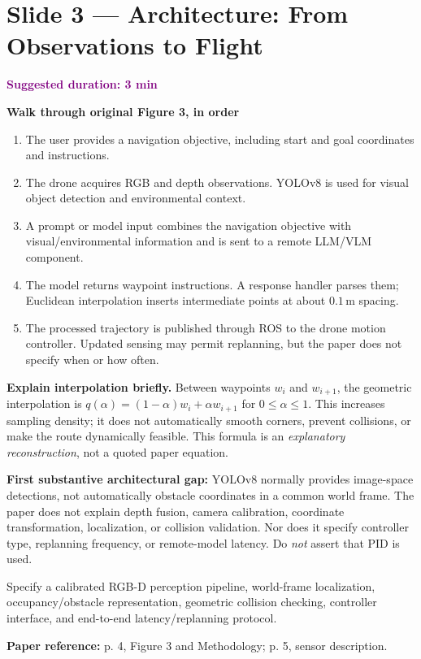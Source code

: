 \documentclass[11pt,a4paper]{article}
\newcommand{\slide}[3]{\clearpage\section*{Slide #1 --- #2}\textcolor{purple}{\textbf{Suggested duration: #3}}\par\medskip}
\newcommand{\source}[1]{\par\small\textcolor{deep}{\textbf{Paper reference:} #1}\normalsize}
\begin{document}
\slide{3}{Architecture: From Observations to Flight}{3 min}
\textbf{Walk through original Figure 3, in order}
\begin{enumerate}[leftmargin=*,itemsep=4pt]
\item The user provides a navigation objective, including start and goal coordinates and instructions.
\item The drone acquires RGB and depth observations. YOLOv8 is used for visual object detection and environmental context.
\item A prompt or model input combines the navigation objective with visual/environmental information and is sent to a remote LLM/VLM component.
\item The model returns waypoint instructions. A response handler parses them; Euclidean interpolation inserts intermediate points at about $0.1\,$m spacing.
\item The processed trajectory is published through ROS to the drone motion controller. Updated sensing may permit replanning, but the paper does not specify when or how often.
\end{enumerate}
\textbf{Explain interpolation briefly.} Between waypoints $w_i$ and $w_{i+1}$, the geometric interpolation is $q(\alpha)=(1-\alpha)w_i+\alpha w_{i+1}$ for $0\leq\alpha\leq1$. This increases sampling density; it does not automatically smooth corners, prevent collisions, or make the route dynamically feasible. This formula is an \emph{explanatory reconstruction}, not a quoted paper equation.
\begin{critique}
\textbf{First substantive architectural gap:} YOLOv8 normally provides image-space detections, not automatically obstacle coordinates in a common world frame. The paper does not explain depth fusion, camera calibration, coordinate transformation, localization, or collision validation. Nor does it specify controller type, replanning frequency, or remote-model latency. Do \emph{not} assert that PID is used.
\end{critique}
\begin{repair}
Specify a calibrated RGB-D perception pipeline, world-frame localization, occupancy/obstacle representation, geometric collision checking, controller interface, and end-to-end latency/replanning protocol.
\end{repair}
\source{p. 4, Figure 3 and Methodology; p. 5, sensor description.}
\end{document}

